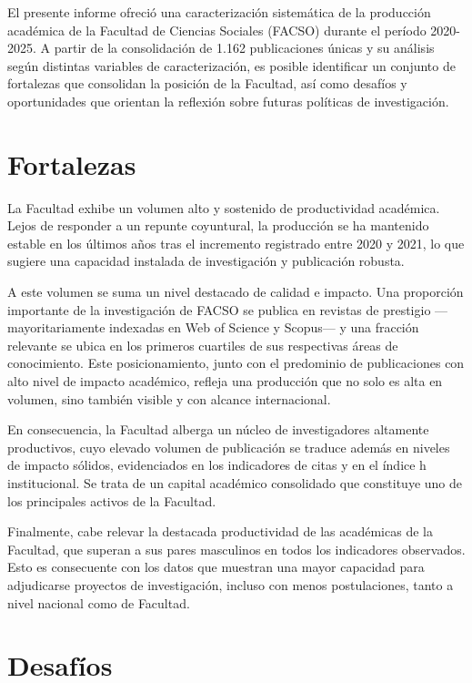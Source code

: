 \documentclass[
  spanish,
  a4paper,
  oneside]{scrbook}
\begin{document}
El presente informe ofreció una caracterización sistemática de la
producción académica de la Facultad de Ciencias Sociales (FACSO) durante
el período 2020-2025. A partir de la consolidación de 1.162
publicaciones únicas y su análisis según distintas variables de
caracterización, es posible identificar un conjunto de fortalezas que
consolidan la posición de la Facultad, así como desafíos y oportunidades
que orientan la reflexión sobre futuras políticas de investigación.

\section{Fortalezas}\label{fortalezas-1}

La Facultad exhibe un volumen alto y sostenido de productividad
académica. Lejos de responder a un repunte coyuntural, la producción se
ha mantenido estable en los últimos años tras el incremento registrado
entre 2020 y 2021, lo que sugiere una capacidad instalada de
investigación y publicación robusta.

A este volumen se suma un nivel destacado de calidad e impacto. Una
proporción importante de la investigación de FACSO se publica en
revistas de prestigio ---mayoritariamente indexadas en Web of Science y
Scopus--- y una fracción relevante se ubica en los primeros cuartiles de
sus respectivas áreas de conocimiento. Este posicionamiento, junto con
el predominio de publicaciones con alto nivel de impacto académico,
refleja una producción que no solo es alta en volumen, sino también
visible y con alcance internacional.

En consecuencia, la Facultad alberga un núcleo de investigadores
altamente productivos, cuyo elevado volumen de publicación se traduce
además en niveles de impacto sólidos, evidenciados en los indicadores de
citas y en el índice h institucional. Se trata de un capital académico
consolidado que constituye uno de los principales activos de la
Facultad.

Finalmente, cabe relevar la destacada productividad de las académicas de
la Facultad, que superan a sus pares masculinos en todos los indicadores
observados. Esto es consecuente con los datos que muestran una mayor
capacidad para adjudicarse proyectos de investigación, incluso con menos
postulaciones, tanto a nivel nacional como de Facultad.

\section{Desafíos}\label{desafuxedos-1}
\end{document}
